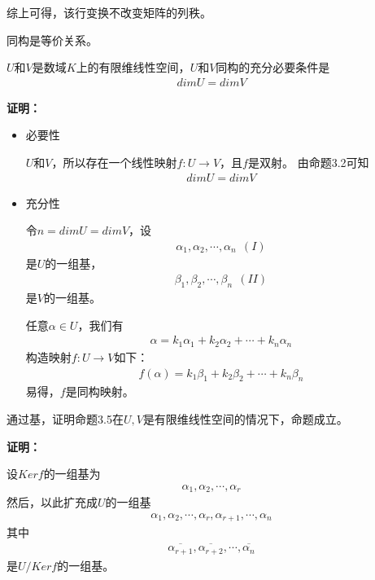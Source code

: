 \documentclass{article}
\begin{document}
综上可得，该行变换不改变矩阵的列秩。


\begin{zremark}
  同构是等价关系。
\end{zremark}

\begin{zremark}
  $U$和$V$是数域$K$上的有限维线性空间，$U$和$V$同构的充分必要条件是
  \begin{align*}
    dim U = dim V
  \end{align*}
\end{zremark}

\textbf{证明：}

\begin{itemize}
  \item 必要性

        $U$和$V$，所以存在一个线性映射$f: U \to V$，且$f$是双射。
        由命题3.2可知
        \begin{align*}
          dim U = dim V
        \end{align*}

  \item 充分性

        令$n = dim U = dim V$，设
        \begin{align*}
          \alpha_1, \alpha_2, \cdots, \alpha_n \ \ (I)
        \end{align*}
        是$U$的一组基，
        \begin{align*}
          \beta_1, \beta_2, \cdots, \beta_n \ \ (II)
        \end{align*}
        是$V$的一组基。

        任意$\alpha \in U$，我们有
        \begin{align*}
          \alpha = k_1 \alpha_1 + k_2 \alpha_2 + \cdots + k_n \alpha_n
        \end{align*}
        构造映射$f: U \to V$如下：
        \begin{align*}
          f(\alpha) = k_1 \beta_1 + k_2 \beta_2 + \cdots + k_n \beta_n
        \end{align*}
        易得，$f$是同构映射。
\end{itemize}

\begin{zremark}
  通过基，证明命题3.5在$U, V$是有限维线性空间的情况下，命题成立。
\end{zremark}

\textbf{证明：}

设$Kerf$的一组基为
\begin{align*}
  \alpha_1, \alpha_2, \cdots, \alpha_r
\end{align*}
然后，以此扩充成$U$的一组基
\begin{align*}
  \alpha_1, \alpha_2, \cdots, \alpha_r, \alpha_{r+1}, \cdots, \alpha_n
\end{align*}
其中
\begin{align*}
  \overline{\alpha_{r+1}}, \overline{\alpha_{r+2}}, \cdots, \overline{\alpha_n}
\end{align*}
是$U/Kerf$的一组基。
\end{document}
